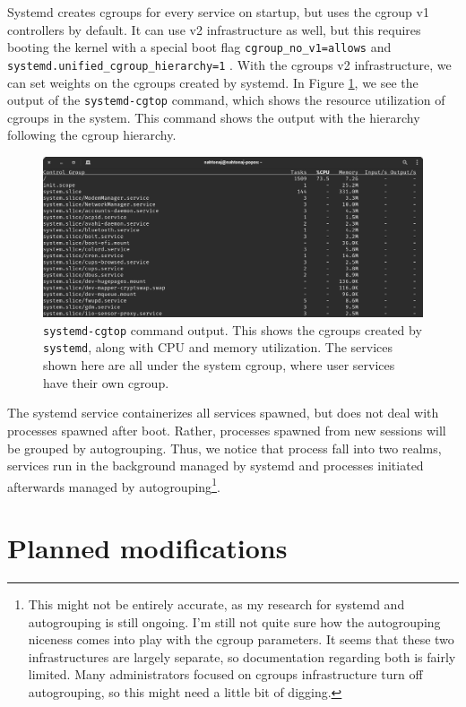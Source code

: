 \documentclass[12pt]{article}
\begin{document}
Systemd creates cgroups for every service on startup, but uses the cgroup v1 controllers by default. It can use v2 infrastructure as well, but this requires booting the kernel with a special boot flag \texttt{cgroup\_no\_v1=allows} and \texttt{systemd.unified\_cgroup\_hierarchy=1} \cite{CgroupsArchWiki}. With the cgroups v2 infrastructure, we can set weights on the cgroups created by systemd. In Figure \ref{fig:systemd-cgtop}, we see the output of the \texttt{systemd-cgtop} command, which shows the resource utilization of cgroups in the system. This command shows the output with the hierarchy following the cgroup hierarchy.

\begin{figure}
    \centering
    \includegraphics[width=\textwidth]{images/systemd-cgtop.png}
    \caption{\texttt{systemd-cgtop} command output. This shows the cgroups created by \texttt{systemd}, along with CPU and memory utilization. The services shown here are all under the system cgroup, where user services have their own cgroup.}
    \label{fig:systemd-cgtop}
\end{figure}

The systemd service containerizes all services spawned, but does not deal with processes spawned after boot. Rather, processes spawned from new sessions will be grouped by autogrouping. Thus, we notice that process fall into two realms, services run in the background managed by systemd and processes initiated afterwards managed by autogrouping\footnote{This might not be entirely accurate, as my research for systemd and autogrouping is still ongoing. I'm still not quite sure how the autogrouping niceness comes into play with the cgroup parameters. It seems that these two infrastructures are largely separate, so documentation regarding both is fairly limited. Many administrators focused on cgroups infrastructure turn off autogrouping, so this might need a little bit of digging.}. 

\section*{Planned modifications}
\end{document}

